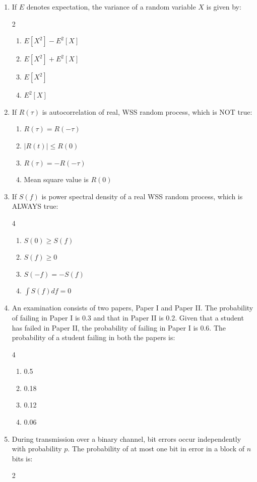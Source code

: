 \begin{enumerate}[label=\thesubsection.\arabic*,ref=\thesubsection.\theenumi]
\item If $ E $ denotes expectation, the variance of a random variable $ X $ is given by:
\hfill{}
    \begin{multicols}{2}
\begin{enumerate}
    \item $ E[X^2] - E^2[X] $
    \item $ E[X^2] + E^2[X] $
    \item $ E[X^2] $
    \item $ E^2[X] $
\end{enumerate}
\end{multicols}
\item If $ R(\tau) $ is autocorrelation of real, WSS random process, which is NOT true: 
\hfill{}
\begin{enumerate}
    \item $ R(\tau) = R(-\tau) $
    \item $ |R(t)| \leq R(0) $
    \item $ R(\tau) = -R(-\tau) $
    \item Mean square value is $ R(0) $
\end{enumerate}

\item If $ S(f) $ is power spectral density of a real WSS random process, which is ALWAYS true: 

\hfill{}
\begin{multicols}{4}
\begin{enumerate}
    \item $ S(0) \geq S(f) $
    \item $ S(f) \geq 0 $
    \item $ S(-f) = -S(f) $
    \item $ \int S(f) df = 0 $
\end{enumerate}
\end{multicols}
\item An examination consists of two papers, Paper I and Paper II. The probability of failing in Paper I is 0.3 and that in Paper II is 0.2. Given that a student has failed in Paper II, the probability of failing in Paper I is 0.6. The probability of a student failing in both the papers is: 
\hfill{}
\begin{multicols}{4}
\begin{enumerate}
    \item 0.5
    \item 0.18
    \item 0.12
    \item 0.06
\end{enumerate}
\end{multicols}
\item During transmission over a binary channel, bit errors occur independently with probability $p$. The probability of {at most one} bit in error in a block of $n$ bits is: 
\hfill{}
\begin{multicols}{2}
    


\end{multicols}
\end{enumerate}
